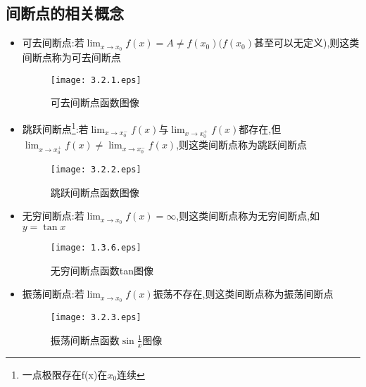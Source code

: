 \documentclass[12pt, a4paper, oneside, UTF8]{ctexbook}
\begin{document}
\begin{sloppypar}
    \subsection{间断点的相关概念}
    \begin{itemize}
        \item 可去间断点:若$\lim_{x\to x_0}f(x)=A\neq f(x_0)(f(x_0)$甚至可以无定义),则这类间断点称为可去间断点
              \begin{figure}[H]
                  \centering \texttt{[image: 3.2.1.eps]} \caption{可去间断点函数图像}
              \end{figure}
        \item 跳跃间断点\footnote{一点极限存在\neq f(x)在$x_0$连续}:若$\lim_{x\to x_0^-}f(x)$与$\lim_{x\to x_0^+}f(x)$都存在,但$\lim_{x\to x_0^+}f(x)\neq\lim_{x\to x_0^-}f(x)$,则这类间断点称为跳跃间断点
              \begin{figure}[H]
                  \centering \texttt{[image: 3.2.2.eps]} \caption{跳跃间断点函数图像}
              \end{figure}
        \item 无穷间断点:若$\lim_{x\to x_0}f(x)=\infty$,则这类间断点称为无穷间断点,如$y=\tan x$
              \begin{figure}[H]
                  \centering \texttt{[image: 1.3.6.eps]} \caption{无穷间断点函数tan图像}
              \end{figure}
        \item 振荡间断点:若$\lim_{x\to x_0}f(x)$振荡不存在,则这类间断点称为振荡间断点
              \begin{figure}[H]
                  \centering \texttt{[image: 3.2.3.eps]} \caption{振荡间断点函数$\sin \frac{1}{x}$图像}
              \end{figure}
    \end{itemize}

\end{sloppypar}
\end{document}
